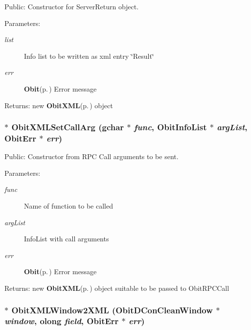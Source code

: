 Public: Constructor for Server\-Return object. 

\begin{Desc}
\item[Parameters:]
\begin{description}
\item[{\em list}]Info list to be written as xml entry \char`\"{}Result\char`\"{} \item[{\em err}]{\bf Obit}{\rm (p.\,\pageref{structObit})} Error message \end{description}
\end{Desc}
\begin{Desc}
\item[Returns:]new {\bf Obit\-XML}{\rm (p.\,\pageref{structObitXML})} object \end{Desc}
\subsubsection{$\ast$ Obit\-XMLSet\-Call\-Arg (gchar $\ast$ {\em func}, {\bf Obit\-Info\-List} $\ast$ {\em arg\-List}, {\bf Obit\-Err} $\ast$ {\em err})}\label{ObitXML_8c_a10}


Public: Constructor from RPC Call arguments to be sent. 

\begin{Desc}
\item[Parameters:]
\begin{description}
\item[{\em func}]Name of function to be called \item[{\em arg\-List}]Info\-List with call arguments \item[{\em err}]{\bf Obit}{\rm (p.\,\pageref{structObit})} Error message \end{description}
\end{Desc}
\begin{Desc}
\item[Returns:]new {\bf Obit\-XML}{\rm (p.\,\pageref{structObitXML})} object suitable to be passed to Obit\-RPCCall \end{Desc}
\subsubsection{$\ast$ Obit\-XMLWindow2XML ({\bf Obit\-DCon\-Clean\-Window} $\ast$ {\em window}, {\bf olong} {\em field}, {\bf Obit\-Err} $\ast$ {\em err})}\label{ObitXML_8c_a21}


